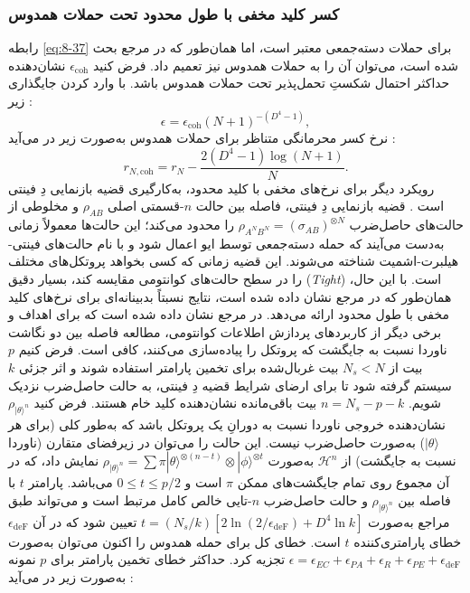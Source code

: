 \subsubsection{کسر کلید مخفی با طول محدود تحت حملات همدوس}
\label{subsec:8-2-1-3}
رابطه \eqref{eq:8-37} برای حملات دسته‌جمعی معتبر است، اما همان‌طور که در مرجع \cite{8-30} بحث شده است، می‌توان آن را به حملات همدوس نیز تعمیم داد. فرض کنید $\epsilon_{\text{coh}}$ نشان‌دهنده حداکثر احتمال شکستِ تحمل‌پذیر تحت حملات همدوس باشد. با وارد کردن جایگذاری زیر \cite{8-30}:
\begin{equation}
	\epsilon = \epsilon_{\text{coh}} (N + 1)^{-(D^4 - 1)},
	\label{eq:8-41}
\end{equation}
نرخ کسر محرمانگی متناظر برای حملات همدوس به‌صورت زیر در می‌آید \cite{8-30}:
\begin{equation}
	r_{N,\text{coh}} = r_N - \frac{2(D^4 - 1) \log(N + 1)}{N}.
	\label{eq:8-42}
\end{equation}
رویکرد دیگر برای نرخ‌های مخفی با کلید محدود، به‌کارگیری قضیه بازنمایی دِ فینتی است \cite{8-28, 8-30, 8-39}. قضیه بازنمایی دِ فینتی، فاصله بین حالت $n$-قسمتی اصلی $\rho_{AB}$ و مخلوطی از حالت‌های حاصل‌ضرب $\rho_{A^N B^N} = (\sigma_{AB})^{\otimes N}$ را محدود می‌کند؛ این حالت‌ها معمولاً زمانی به‌دست می‌آیند که حمله دسته‌جمعی توسط ایو اعمال شود \cite{8-28, 8-30, 8-39} و با نام حالت‌های فینتی-هیلبرت-اشمیت شناخته می‌شوند. این قضیه زمانی که کسی بخواهد پروتکل‌های مختلف  را در سطح حالت‌های کوانتومی مقایسه کند، بسیار دقیق (\textit{Tight}) است. با این حال، همان‌طور که در مرجع \cite{8-30} نشان داده شده است، نتایج نسبتاً بدبینانه‌ای برای نرخ‌های کلید مخفی با طول محدود ارائه می‌دهد. در مرجع \cite{8-40} نشان داده شده است که برای اهداف  و برخی دیگر از کاربردهای پردازش اطلاعات کوانتومی، مطالعه فاصله بین دو نگاشت ناوردا نسبت به جایگشت که پروتکل  را پیاده‌سازی می‌کنند، کافی است. فرض کنیم $p$ بیت از $N_s < N$ بیت غربال‌شده برای تخمین پارامتر استفاده شوند و اثر جزئی $k$ سیستم گرفته شود تا برای ارضای شرایط قضیه دِ فینتی، به حالت حاصل‌ضرب نزدیک شویم. $n = N_s - p - k$ بیت باقی‌مانده نشان‌دهنده کلید خام هستند. فرض کنید $\rho_{| \theta \rangle^n}$ نشان‌دهنده خروجی ناوردا نسبت به دورانِ یک پروتکل  باشد که به‌طور کلی (برای هر $| \theta \rangle$) به‌صورت حاصل‌ضرب نیست. این حالت را می‌توان در زیرفضای متقارن (ناوردا نسبت به جایگشت) از $\mathcal{H}^n$ به‌صورت $\rho_{| \theta \rangle^n} = \sum \pi | \theta \rangle^{\otimes (n-t)} \otimes | \phi \rangle^{\otimes t}$ نمایش داد، که در آن مجموع روی تمام جایگشت‌های ممکن $\pi$ است و $0 \leq t \leq p/2$ می‌باشد. پارامتر $t$ با فاصله بین $\rho_{| \theta \rangle^n}$ و حالت حاصل‌ضرب $n$-تایی خالص کامل مرتبط است و می‌تواند طبق مراجع \cite{8-28, 8-30} به‌صورت $t = (N_s/k)[2 \ln (2/\epsilon_{\text{deF}}) + D^4 \ln k]$ تعیین شود که در آن $\epsilon_{\text{deF}}$ خطای پارامتری‌کننده $t$ است. خطای کل برای حمله همدوس را اکنون می‌توان به‌صورت $\epsilon = \epsilon_{EC} + \epsilon_{PA} + \epsilon_R + \epsilon_{PE} + \epsilon_{\text{deF}}$ تجزیه کرد. حداکثر خطای تخمین پارامتر برای $p$ نمونه به‌صورت زیر در می‌آید \cite{8-30}:
